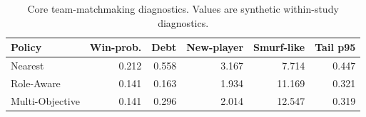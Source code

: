\begin{table}[t]
\centering
\small
\caption{Core team-matchmaking diagnostics. Values are synthetic within-study diagnostics.}
\label{tab:core-team}
\setlength{\tabcolsep}{4pt}
\begin{tabularx}{\textwidth}{lrrrrr}
\toprule
Policy & Win-prob. & Debt & New-player & Smurf-like & Tail p95 \\
\midrule
Nearest & 0.212 & 0.558 & 3.167 & 7.714 & 0.447 \\
Role-Aware & 0.141 & 0.163 & 1.934 & 11.169 & 0.321 \\
Multi-Objective & 0.141 & 0.296 & 2.014 & 12.547 & 0.319 \\
\bottomrule
\end{tabularx}
\end{table}
